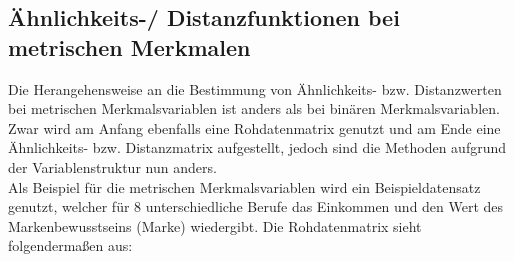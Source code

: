 \documentclass[12pt,titlepage]{article}
\begin{document}
		\subsection{Ähnlichkeits-/ Distanzfunktionen bei metrischen Merkmalen}
			Die Herangehensweise an die Bestimmung von Ähnlichkeits- bzw. Distanzwerten bei metrischen Merkmalsvariablen ist anders als bei binären Merkmalsvariablen. Zwar wird am Anfang ebenfalls eine Rohdatenmatrix genutzt und am Ende eine Ähnlichkeits- bzw. Distanzmatrix aufgestellt, jedoch sind die Methoden aufgrund der Variablenstruktur nun anders. \\
Als Beispiel für die metrischen Merkmalsvariablen wird ein Beispieldatensatz genutzt, welcher für 8 unterschiedliche Berufe das Einkommen und den Wert des Markenbewusstseins (Marke) wiedergibt. Die Rohdatenmatrix sieht folgendermaßen aus:
\end{document}
